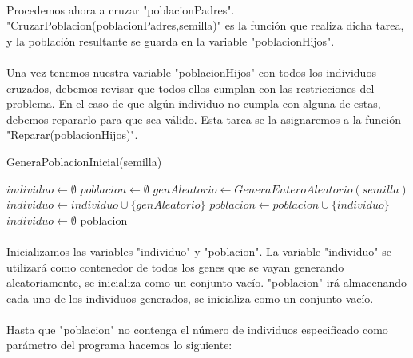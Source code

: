 	\paragraph{}Procedemos ahora a cruzar "poblacionPadres". "CruzarPoblacion(poblacionPadres,semilla)" es la función que realiza dicha tarea, y la población resultante se guarda en la variable "poblacionHijos".
	
	\paragraph{}Una vez tenemos nuestra variable "poblacionHijos" con todos los individuos cruzados, debemos revisar que todos ellos cumplan con las restricciones del problema. En el caso de que algún individuo no cumpla con alguna de estas, debemos repararlo para que sea válido. Esta tarea se la asignaremos a la función "Reparar(poblacionHijos)".
	
		
	\begin{algorithm}[H]
		\caption{GeneraPoblacionInicial(semilla)}
		\begin{algorithmic}
			\STATE $individuo \leftarrow \emptyset$
			\STATE $poblacion \leftarrow \emptyset$
			\STATE $genAleatorio \leftarrow GeneraEnteroAleatorio(semilla)$
			\STATE $individuo \leftarrow individuo\cup\{genAleatorio\}$
			\ENDIF
			\ENDWHILE
			\STATE $poblacion \leftarrow poblacion\cup\{individuo\}$
			\STATE $individuo \leftarrow \emptyset$
			\ENDWHILE
			\RETURN poblacion
		\end{algorithmic}
	\end{algorithm}

	\paragraph{}Inicializamos las variables "individuo" y "poblacion". La variable "individuo" se utilizará como contenedor de todos los genes que se vayan generando aleatoriamente, se inicializa como un conjunto vacío. "poblacion" irá almacenando cada uno de los individuos generados, se inicializa como un conjunto vacío.
	
	\paragraph{}Hasta que "poblacion" no contenga el número de individuos especificado como parámetro del programa hacemos lo siguiente:
	
